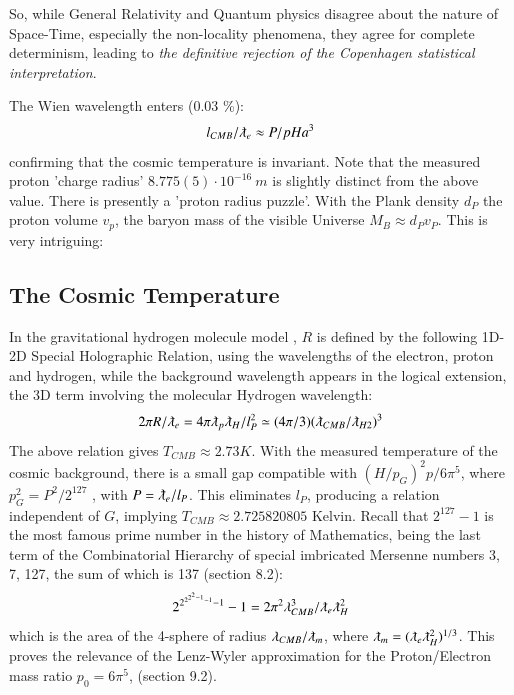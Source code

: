 \documentclass[twoside,draft]{article}
\begin{document}
\begin{sloppypar}
So, while General Relativity and Quantum physics disagree about the nature of Space-Time, especially the non-locality phenomena, they agree for complete determinism, leading to \textit{the definitive rejection of the
Copenhagen statistical interpretation}. 

The Wien wavelength enters (0.03 \%):
\begin{equation}
l_{CMB} / \lambdabar_e \approx P/pH a^3
\end{equation}
confirming that the cosmic temperature is invariant.
Note that the measured proton 'charge radius' $8.775(5)\cdot 10^{-16}~m$ is slightly distinct from the above value. There is presently a 'proton radius puzzle'\cite{Carlson}. With the Plank density $d_{P}$ the proton volume  $v_p$, the baryon mass of the visible Universe $M_B\approx d_Pv_P $. This is very intriguing\cite{Haramein}:

\subsection{The Cosmic Temperature}

In the gravitational hydrogen molecule model \cite{Sanchez1}, $R$ is defined by the following 1D-2D Special
Holographic Relation, using the wavelengths of the electron, proton and hydrogen, while the background wavelength appears in the logical extension, the 3D term involving the molecular Hydrogen wavelength:
\begin{equation}
2 \pi R/\lambdabar_{e} = 4 \pi \lambdabar_{p} \lambdabar_{H} /l_{P}^2 \simeq (4\pi/3)(\lambdabar_{CMB} /\lambdabar_{H2})^{3}
\end{equation}
The above relation gives $T_{CMB} \approx 2.73 K$. With the measured temperature of the cosmic
background, there is a small gap compatible with $(H/p_G)^2 p/6\pi^5 $, where $p_{G}^{2} = P^{2} /2^{127}$ , with $P = \lambdabar_{e} /l_{P}$. 
This eliminates $l_{P}$, producing a relation independent of $G$, implying $T_{CMB} \approx 2.725820805$ Kelvin. Recall
that $2^{127} - 1$ is the most famous prime number in the history of Mathematics, being the last term of
the Combinatorial Hierarchy \cite{Sanchez1} of special imbricated Mersenne numbers 3, 7, 127, the sum of which is 137 (section 8.2):
\begin{equation}
2^{2^{{2^{2^2 - 1}-1}}-1}-1 = 2\pi^{2} \lambda_{CMB}^{3} /\lambdabar_{e} \lambdabar_{H}^2   
\end{equation}
which is the area of the 4-sphere of radius $\lambda_{CMB} / \lambdabar_{m}$, where $\lambdabar_{m} = (\lambdabar_{e} \lambdabar_{H}^2)^{1/3} $. This proves the relevance of
the Lenz-Wyler approximation for the Proton/Electron mass ratio $p_0 = 6\pi^{5}$, (section 9.2). 


\end{sloppypar}
\end{document}
